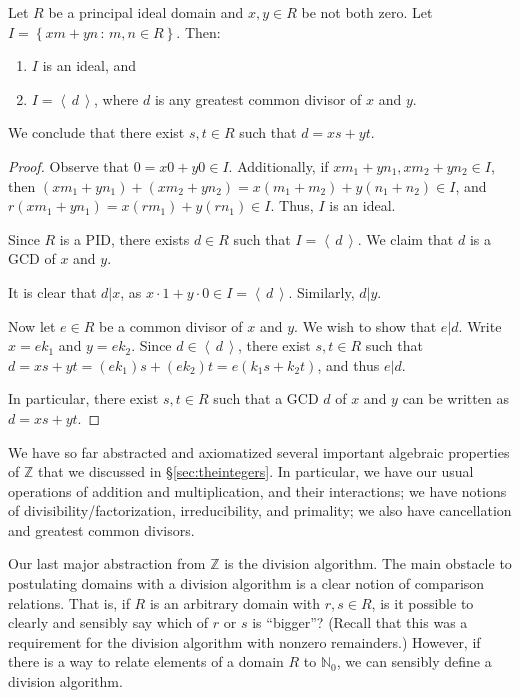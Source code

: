 \documentclass[english,course]{lecture}
\newcommand{\ideal}[1]{\left\langle\, #1 \,\right\rangle}
\theoremstyle{plain}
\def\setof#1#2{{\left\{#1\,\colon\,#2\right\}}}
\def\Z{{\mathbb Z}}
\def\N{{\mathbb N}}
\def\presnotes{}
\begin{document}
\presnotes


\begin{theorem}
    Let $R$ be a principal ideal domain and $x,y\in R$ be not both zero.
    Let $I = \setof{xm+yn}{m,n\in R}$.
    Then:
    \begin{enumerate}
        \item $I$ is an ideal, and
        \item $I = \ideal{d}$, where $d$ is any greatest common divisor of $x$ and $y$.
    \end{enumerate}
    We conclude that there exist $s,t\in R$ such that $d = xs + yt$.
\end{theorem}

\begin{proof}
    Observe that $0 = x0 + y0 \in I$.
    Additionally, if $x m_1 + y n_1, x m_2 + y n_2\in I$, then $(x m_1 + y n_1) + (x m_2 + y n_2) = x (m_1 + m_2) + y (n_1 + n_2) \in I$, and $r(x m_1 + y n_1) = x (rm_1) + y(rn_1) \in I$.
    Thus, $I$ is an ideal.

    Since $R$ is a PID, there exists $d\in R$ such that $I = \ideal{d}$.
    We claim that $d$ is a GCD of $x$ and $y$.
    
    It is clear that $d|x$, as $x\cdot 1 + y\cdot 0\in I = \ideal{d}$.
    Similarly, $d|y$.
    
    Now let $e\in R$ be a common divisor of $x$ and $y$.
    We wish to show that $e|d$.
    Write $x = e k_1$ and $y = e k_2$.
    Since $d\in \ideal{d}$, there exist $s,t\in R$ such that $d = x s + yt = (e k_1) s + (e k_2)t = e(k_1 s + k_2 t)$, and thus $e|d$.
    
    In particular, there exist $s,t\in R$ such that a GCD $d$ of $x$ and $y$ can be written as $d = xs + yt$.
\end{proof}

\presnotes

We have so far abstracted and axiomatized several important algebraic properties of $\Z$ that we discussed in  \S \ref{sec:theintegers}.
In particular, we have our usual operations of addition and multiplication, and their interactions; we have notions of divisibility/factorization, irreducibility, and primality; we also have cancellation and greatest common divisors.

Our last major abstraction from $\Z$ is the division algorithm.
The main obstacle to postulating domains with a division algorithm is a clear notion of comparison relations.
That is, if $R$ is an arbitrary domain with $r,s\in R$, is it possible to clearly and sensibly say which of $r$ or $s$ is ``bigger''? (Recall that this was a requirement for the division algorithm with nonzero remainders.)
However, if there is a way to relate elements of a domain $R$ to $\N_0$, we can sensibly define a division algorithm.
\end{document}
